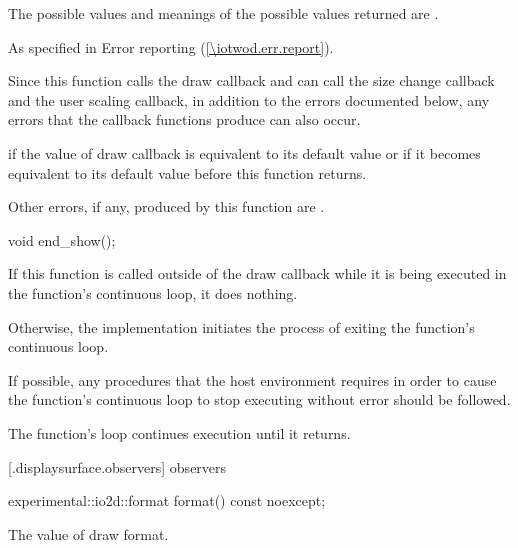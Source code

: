 \begin{itemdescr}
\pnum
\returns
The possible values and meanings of the possible values returned are .

\pnum
\throws
As specified in Error reporting (\ref{\iotwod.err.report}).

\pnum
\remarks
Since this function calls the draw callback and can call the size change callback and the user scaling callback, in addition to the errors documented below, any errors that the callback functions produce can also occur.

\pnum
\errors
{} if the value of draw callback is equivalent to its default value or if it becomes equivalent to its default value before this function returns.

\pnum
Other errors, if any, produced by this function are .
\end{itemdescr}

%
\begin{itemdecl}
void end_show();
\end{itemdecl}
\begin{itemdescr}
\pnum
\effects
If this function is called outside of the draw callback while it is being executed in the  function's continuous loop, it does nothing.

\pnum
Otherwise, the implementation initiates the process of exiting the  function's continuous loop.

\pnum
If possible, any procedures that the host environment requires in order to cause the  function's continuous loop to stop executing without error should be followed.

\pnum
The  function's loop continues execution until it returns.
\end{itemdescr}

 [\iotwod.displaysurface.observers]{ observers}

%
\begin{itemdecl}
experimental::io2d::format format() const noexcept;
\end{itemdecl}
\begin{itemdescr}
\pnum
\returns
The value of draw format.
\end{itemdescr}

